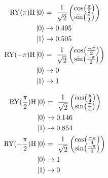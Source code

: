 \begin{equation}
    \centering
    \begin{split}
        \mathrm{RY}(\pi)\mathrm{H}\ket{0} &=\ \frac{1}{\sqrt{2}}\begin{pmatrix}\cos(\frac{\pi}{2}) \\ \sin(\frac{\pi}{2})\end{pmatrix}\\
        \ket{0} &\to 0.495 \\
        \ket{1} &\to 0.505 \\
        \mathrm{RY}(-\pi)\mathrm{H}\ket{0} &=\ \frac{1}{\sqrt{2}}\begin{pmatrix}\cos(\frac{-\pi}{2}) \\ \sin(\frac{-\pi}{2})\end{pmatrix}\\
        \ket{0} &\to 0 \\
        \ket{1} &\to 1 \\
    \end{split}
    \label{equation:normalization_range_pi}
\end{equation}

\begin{equation}
    \centering
    \begin{split}
        \mathrm{RY}(\frac{\pi}{2})\mathrm{H}\ket{0} &=\ \frac{1}{\sqrt{2}}\begin{pmatrix}\cos(\frac{\pi}{4}) \\ \sin(\frac{\pi}{4})\end{pmatrix}\\
        \ket{0} &\to 0.146 \\
        \ket{1} &\to 0.854 \\
        \mathrm{RY}(-\frac{\pi}{2})\mathrm{H}\ket{0} &=\ \frac{1}{\sqrt{2}}\begin{pmatrix}\cos(\frac{-\pi}{4}) \\ \sin(\frac{-\pi}{4})\end{pmatrix}\\
        \ket{0} &\to 1 \\
        \ket{1} &\to 0 \\
    \end{split}
    \label{equation:normalization_range_half_pi}
\end{equation}

